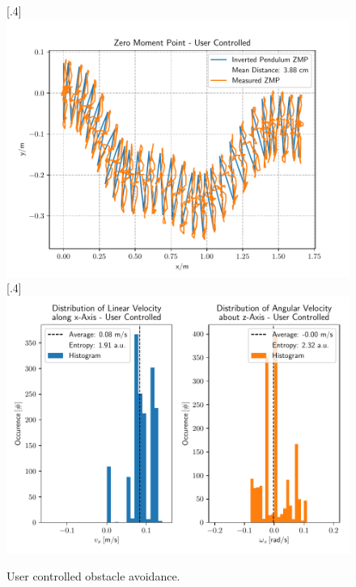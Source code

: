 \begin{figure}[h!]
	\centering
	[.4\linewidth]{\includegraphics[scale=.35]{chapters/05_experiments/01_user_controlled_walking/02_test_environment/obstacle_walk_02_zmp.pdf}}
	[.4\linewidth]{\includegraphics[scale=.35]{chapters/05_experiments/01_user_controlled_walking/02_test_environment/obstacle_walk_02_entropy.pdf}}
	\caption{User controlled obstacle avoidance.}
	\label{fig::512_uc_obstacle}
\end{figure} 
